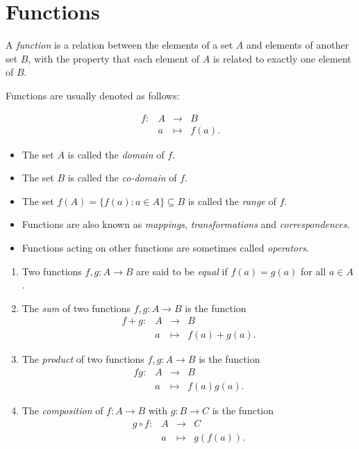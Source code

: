 \documentclass[lecture]{csm}
\def\it{\item}
\def\bit{\begin{itemize}}
\def\eit{\end{itemize}}
\def\ben{\begin{enumerate}}
\def\een{\end{enumerate}}
\begin{document}
\maketitle
\tableofcontents

\section{Functions}

\begin{definition}
A \emph{function} is a relation between the elements of a set $A$ and elements of another set $B$, with the property that each element of $A$ is related to exactly one element of $B$.

\vspace*{2ex}
Functions are usually denoted as follows:

\[\begin{array}{rlcl}
f: 	& A & \to		& B \\
	& a & \mapsto	& f(a).
\end{array}\]
\end{definition}

\bit
\it The set $A$ is called the \emph{domain} of $f$.
\it The set $B$ is called the \emph{co-domain} of $f$.
\it The set $f(A)=\{f(a):a\in A\}\subseteq B$ is called the \emph{range} of $f$.
\eit

\bit
\it Functions are also known as \emph{mappings}, \emph{transformations} and \emph{correspondences}.
\it Functions acting on other functions are sometimes called \emph{operators}.
\eit


\break %

\begin{definition}
\ben
\it
Two functions $f,g:A\to B$ are said to be \emph{equal} if $f(a)=g(a)$ for all $a\in A$.
\it 
The \emph{sum} of two functions $f,g:A\to B$ is the function
\[\begin{array}{rlclcrlcl}
f+g:	& A & \to		& B				\\
	& a & \mapsto	& f(a) + g(a).
\end{array}\]
\it
The \emph{product} of two functions $f,g:A\to B$ is the function
\[\begin{array}{rlclcrlcl}
fg:	& A & \to		& B \\
	& a & \mapsto	& f(a)g(a).
\end{array}\]
\it
The \emph{composition} of $f:A\to B$ with $g:B\to C$ is the function
\[\begin{array}{rlcl}
g\circ f: 	& A & \to		& C \\
			& a & \mapsto	& g(f(a)).
\end{array}\]
\een
\end{definition}
\end{document}
